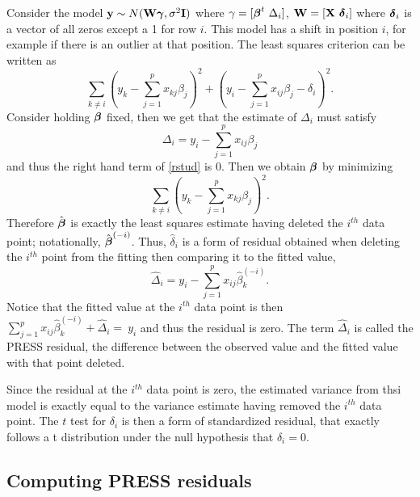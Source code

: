 Consider the model $\mathbf{y} \sim N(\mathbf{W} \boldsymbol{\gamma}, \sigma^2 \mathbf{I})$
where $\gamma = [\boldsymbol{\beta}^t ~ \Delta_i]$, 
$\mathbf{W} = [\mathbf{X} ~ \boldsymbol{\delta}_i]$ where $\boldsymbol{\delta}_i$ is a vector of all zeros
except a 1 for row $i$. This model has a shift in position $i$, for 
example if there is an outlier at that position. 
The least squares criterion can be written as
\begin{equation}
\label{rstud}
\sum_{k\neq i} \left(y_k - \sum_{j = 1}^p x_{kj} \beta_j \right)^2
+ \left(y_i - \sum_{j=1}^p x_{ij} \beta_j - \delta_i\right)^2.
\end{equation}
Consider holding $\boldsymbol{\beta}$ fixed, then we get that the estimate of
$\Delta_i$ must satisfy
$$
\Delta_i = y_i - \sum_{j=1}^p x_{ij} \beta_j
$$
and thus the right hand term of \eqref{rstud} is 0. Then we obtain $\boldsymbol{\beta}$ by minimizing
$$
\sum_{k\neq i} \left(y_k - \sum_{j = 1}^p x_{kj} \beta_j \right)^2.
$$
Therefore $\hat {\boldsymbol{\beta}}$ is exactly the least squares estimate having
deleted the $i^{th}$ data point; notationally, $\hat{\boldsymbol{\beta}}^{(-i)}$. Thus, $\hat \delta_i$ 
is a form of residual obtained when deleting
the $i^{th}$ point from the fitting then comparing it to the fitted value, 
$$
\hat \Delta_i = y_i - \sum_{j=1}^p x_{ij} \hat \beta^{(-i)}_{k}.
$$
Notice that the fitted value at the $i^{th}$ data point is then 
$\sum_{j=1}^p x_{ij} \hat \beta^{(-i)}_{k} + \hat \Delta_i = \ y_i$ and thus
the residual is zero. The term $\hat \Delta_i$ is called the PRESS residual, the
difference between the observed value and the fitted value with that point deleted.

Since the residual at the $i^{th}$ data point is zero, the estimated variance from
thsi model is exactly equal to the variance estimate having removed the
$i^{th}$ data point. The $t$ test for $\delta_i$ is then a form of 
standardized residual, that exactly follows a t distribution under the null
hypothesis that $\delta_i = 0$. 

\subsection{Computing PRESS residuals}

